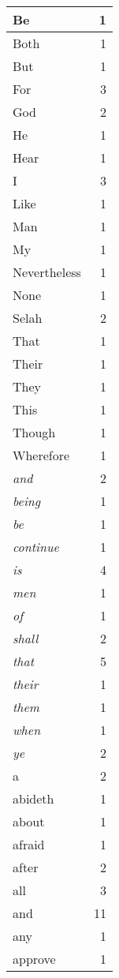 \begin{center}
\begin{longtable}{l|r}
\hline \hline
\endlastfoot
Be & 1 \\ \hline
Both & 1 \\ \hline
But & 1 \\ \hline
For & 3 \\ \hline
God & 2 \\ \hline
He & 1 \\ \hline
Hear & 1 \\ \hline
I & 3 \\ \hline
Like & 1 \\ \hline
Man & 1 \\ \hline
My & 1 \\ \hline
Nevertheless & 1 \\ \hline
None & 1 \\ \hline
Selah & 2 \\ \hline
That & 1 \\ \hline
Their & 1 \\ \hline
They & 1 \\ \hline
This & 1 \\ \hline
Though & 1 \\ \hline
Wherefore & 1 \\ \hline
\emph{and} & 2 \\ \hline
\emph{being} & 1 \\ \hline
\emph{be} & 1 \\ \hline
\emph{continue} & 1 \\ \hline
\emph{is} & 4 \\ \hline
\emph{men} & 1 \\ \hline
\emph{of} & 1 \\ \hline
\emph{shall} & 2 \\ \hline
\emph{that} & 5 \\ \hline
\emph{their} & 1 \\ \hline
\emph{them} & 1 \\ \hline
\emph{when} & 1 \\ \hline
\emph{ye} & 2 \\ \hline
a & 2 \\ \hline
abideth & 1 \\ \hline
about & 1 \\ \hline
afraid & 1 \\ \hline
after & 2 \\ \hline
all & 3 \\ \hline
and & 11 \\ \hline
any & 1 \\ \hline
approve & 1 \\ \hline

\end{longtable}
\end{center}
